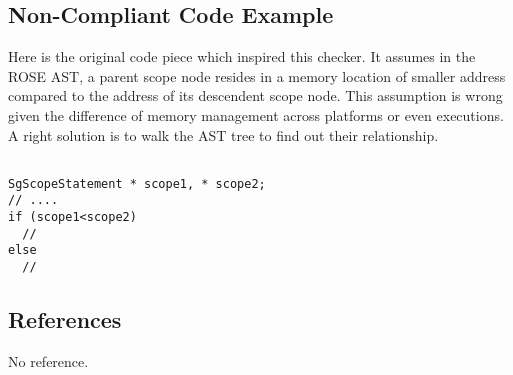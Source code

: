\subsection{Non-Compliant Code Example}

Here is the original code piece which inspired this checker. 
It assumes in the ROSE AST, a parent scope node resides in a memory location of smaller
address compared to the address of its descendent scope node. 
This assumption is wrong given the difference of memory management across
platforms or even executions. A right solution is to walk the AST tree to
find out their relationship.
\begin{verbatim}

SgScopeStatement * scope1, * scope2; 
// ....
if (scope1<scope2)
  //
else
  //

\end{verbatim}

\subsection{References}
No reference.
